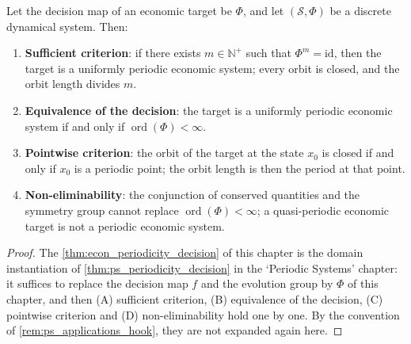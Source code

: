 \begin{theorem}\label{thm:econ_periodicity_decision}
Let the decision map of an economic target be $\Phi$, and let $(\mathcal S,\Phi)$ be a discrete dynamical system. Then:
\begin{enumerate}[label=(\Alph*)]
    \item \textbf{Sufficient criterion}: if there exists $m\in\mathbb N^+$ such that $\Phi^m=\mathrm{id}$, then the target is a uniformly periodic economic system; every orbit is closed, and the orbit length divides $m$.
    \item \textbf{Equivalence of the decision}: the target is a uniformly periodic economic system if and only if $\operatorname{ord}(\Phi)<\infty$.
    \item \textbf{Pointwise criterion}: the orbit of the target at the state $x_0$ is closed if and only if $x_0$ is a periodic point; the orbit length is then the period at that point.
    \item \textbf{Non-eliminability}: the conjunction of conserved quantities and the symmetry group cannot replace $\operatorname{ord}(\Phi)<\infty$; a quasi-periodic economic target is not a periodic economic system.
\end{enumerate}
\end{theorem}

\begin{proof}
The \cref{thm:econ_periodicity_decision} of this chapter is the domain instantiation of \cref{thm:ps_periodicity_decision} in the `Periodic Systems' chapter:
it suffices to replace the decision map $f$ and the evolution group by $\Phi$ of this chapter, and then (A) sufficient criterion, (B) equivalence of the decision, (C) pointwise criterion and
(D) non-eliminability hold one by one. By the convention of \cref{rem:ps_applications_hook}, they are not expanded again here.
\end{proof}

